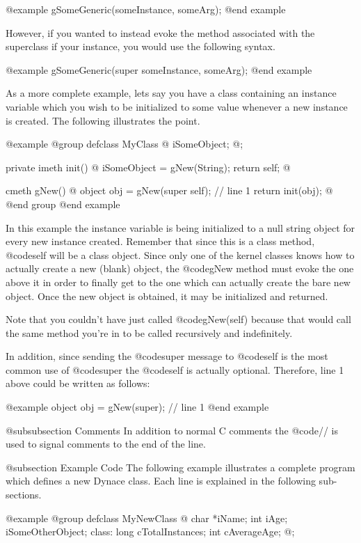 @example
        gSomeGeneric(someInstance, someArg);
@end example

However, if you wanted to instead evoke the method associated with the
superclass if your instance, you would use the following syntax.

@example
        gSomeGeneric(super  someInstance, someArg);
@end example

As a more complete example, lets say you have a class containing an
instance variable which you wish to be initialized to some value
whenever a new instance is created.  The following illustrates the
point.

@example
@group
defclass  MyClass  @{
        iSomeObject;
@};

private imeth init()
@{
        iSomeObject = gNew(String);
        return self;
@}

cmeth  gNew()
@{
        object  obj = gNew(super self);  // line 1
        return init(obj);
@}
@end group
@end example

In this example the instance variable is being initialized to a null
string object for every new instance created.  Remember that since
this is a class method, @code{self} will be a class object.  Since
only one of the kernel classes knows how to actually create a new
(blank) object, the @code{gNew} method must evoke the one above it
in order to finally get to the one which can actually create the
bare new object.  Once the new object is obtained, it may be initialized
and returned.

Note that you couldn't have just called @code{gNew(self)}
because that would call the same method you're in to be called
recursively and indefinitely.

In addition, since sending the @code{super} message to @code{self}
is the most common use of @code{super} the @code{self} is
actually optional.  Therefore, line 1 above could be written as follows:

@example
        object  obj = gNew(super);  // line 1
@end example


@subsubsection Comments
In addition to normal C comments the @code{//} is used to signal comments
to the end of the line.


@subsection Example Code
The following example illustrates a complete program which defines a new
Dynace class.  Each line is explained in the following sub-sections.

@example
@group
defclass  MyNewClass  @{
        char    *iName;
        int     iAge;
        iSomeOtherObject;
 class:
        long    cTotalInstances;
        int     cAverageAge;
@};

